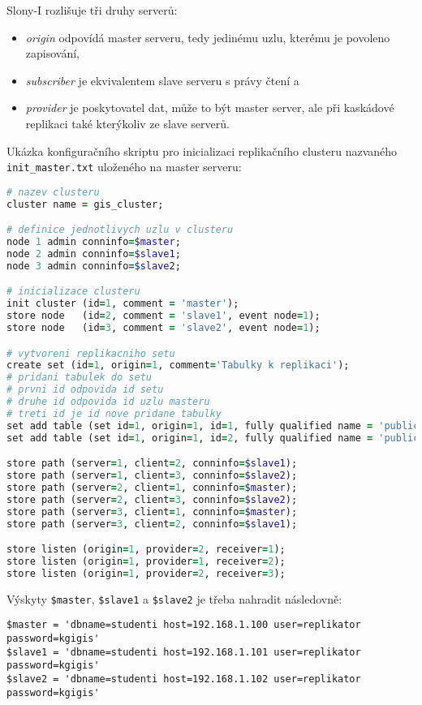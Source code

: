 Slony-I rozlišuje tři druhy serverů:
\begin{itemize}
  \item {\it origin} odpovídá master serveru, tedy jedinému uzlu, kterému je povoleno
    zapisování,
  \item {\it subscriber} je ekvivalentem slave serveru s právy čtení a
  \item {\it provider} je poskytovatel dat, může to být master server, ale při kaskádové
    replikaci také kterýkoliv ze slave serverů.
\end{itemize}

Ukázka konfiguračního skriptu pro inicializaci replikačního clusteru nazvaného
\texttt{init\_master.txt} uloženého na master serveru:

\begin{lstlisting}[language=ruby]
# nazev clusteru
cluster name = gis_cluster;

# definice jednotlivych uzlu v clusteru
node 1 admin conninfo=$master;
node 2 admin conninfo=$slave1;
node 3 admin conninfo=$slave2;

# inicializace clusteru
init cluster (id=1, comment = 'master');
store node   (id=2, comment = 'slave1', event node=1);
store node   (id=3, comment = 'slave2', event node=1);

# vytvoreni replikacniho setu
create set (id=1, origin=1, comment='Tabulky k replikaci');
# pridani tabulek do setu
# prvni id odpovida id setu
# druhe id odpovida id uzlu masteru
# treti id je id nove pridane tabulky
set add table (set id=1, origin=1, id=1, fully qualified name = 'public.student', comment='seznam studentu');
set add table (set id=1, origin=1, id=2, fully qualified name = 'public.rodne_mesto', comment='seznam mest');

store path (server=1, client=2, conninfo=$slave1);
store path (server=1, client=3, conninfo=$slave2);
store path (server=2, client=1, conninfo=$master);
store path (server=2, client=3, conninfo=$slave2);
store path (server=3, client=1, conninfo=$master);
store path (server=3, client=2, conninfo=$slave1);

store listen (origin=1, provider=2, receiver=1);
store listen (origin=1, provider=1, receiver=2);
store listen (origin=1, provider=2, receiver=3);
\end{lstlisting}
Výskyty \texttt{\$master}, \texttt{\$slave1} a \texttt{\$slave2} je třeba nahradit
následovně:
\begin{lstlisting}
$master = 'dbname=studenti host=192.168.1.100 user=replikator password=kgigis'
$slave1 = 'dbname=studenti host=192.168.1.101 user=replikator password=kgigis'
$slave2 = 'dbname=studenti host=192.168.1.102 user=replikator password=kgigis'
\end{lstlisting}

